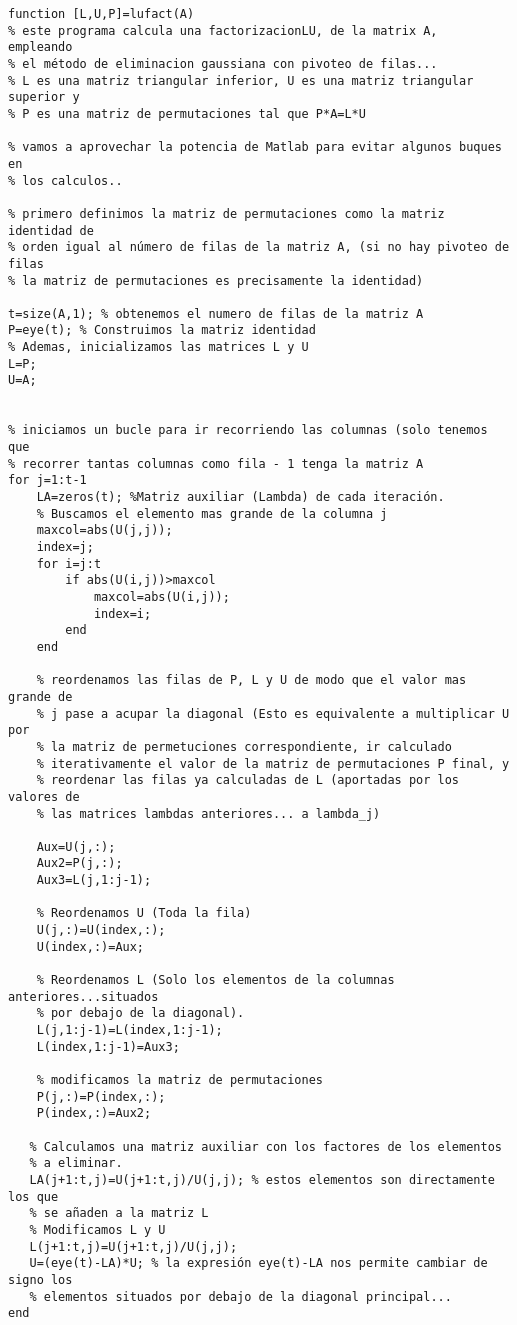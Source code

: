 \begin{lstlisting}
function [L,U,P]=lufact(A)
% este programa calcula una factorizacionLU, de la matrix A,  empleando 
% el método de eliminacion gaussiana con pivoteo de filas...
% L es una matriz triangular inferior, U es una matriz triangular superior y
% P es una matriz de permutaciones tal que P*A=L*U

% vamos a aprovechar la potencia de Matlab para evitar algunos buques en
% los calculos..

% primero definimos la matriz de permutaciones como la matriz identidad de
% orden igual al número de filas de la matriz A, (si no hay pivoteo de filas 
% la matriz de permutaciones es precisamente la identidad)

t=size(A,1); % obtenemos el numero de filas de la matriz A
P=eye(t); % Construimos la matriz identidad 
% Ademas, inicializamos las matrices L y U
L=P;
U=A;


% iniciamos un bucle para ir recorriendo las columnas (solo tenemos que
% recorrer tantas columnas como fila - 1 tenga la matriz A
for j=1:t-1
    LA=zeros(t); %Matriz auxiliar (Lambda) de cada iteración.
    % Buscamos el elemento mas grande de la columna j
    maxcol=abs(U(j,j)); 
    index=j;
    for i=j:t
        if abs(U(i,j))>maxcol
            maxcol=abs(U(i,j));
            index=i;
        end
    end
    
    % reordenamos las filas de P, L y U de modo que el valor mas grande de
    % j pase a acupar la diagonal (Esto es equivalente a multiplicar U por
    % la matriz de permetuciones correspondiente, ir calculado
    % iterativamente el valor de la matriz de permutaciones P final, y
    % reordenar las filas ya calculadas de L (aportadas por los valores de
    % las matrices lambdas anteriores... a lambda_j)
    
    Aux=U(j,:);
    Aux2=P(j,:);
    Aux3=L(j,1:j-1);
    
    % Reordenamos U (Toda la fila)
    U(j,:)=U(index,:);
    U(index,:)=Aux;
    
    % Reordenamos L (Solo los elementos de la columnas anteriores...situados
    % por debajo de la diagonal).
    L(j,1:j-1)=L(index,1:j-1);
    L(index,1:j-1)=Aux3;
    
    % modificamos la matriz de permutaciones
    P(j,:)=P(index,:);
    P(index,:)=Aux2;
    
   % Calculamos una matriz auxiliar con los factores de los elementos
   % a eliminar. 
   LA(j+1:t,j)=U(j+1:t,j)/U(j,j); % estos elementos son directamente los que 
   % se añaden a la matriz L
   % Modificamos L y U
   L(j+1:t,j)=U(j+1:t,j)/U(j,j);
   U=(eye(t)-LA)*U; % la expresión eye(t)-LA nos permite cambiar de signo los
   % elementos situados por debajo de la diagonal principal...
end
\end{lstlisting}


